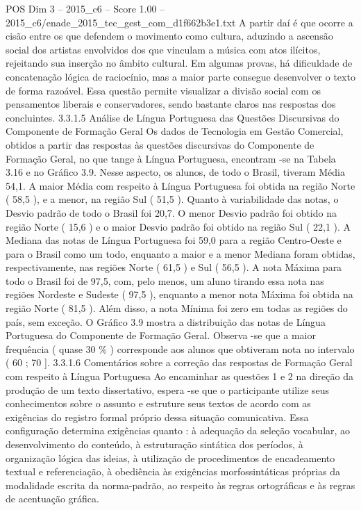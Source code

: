 \begin{textsample}{POS Dim 3 – 2015\_c6 – Score 1.00 – 2015\_c6/enade\_2015\_tec\_gest\_com\_d1f662b3e1.txt}
A partir daí é que ocorre a cisão entre os que defendem o movimento como cultura, aduzindo a ascensão social dos artistas envolvidos dos que vinculam a música com atos ilícitos, rejeitando sua inserção no âmbito cultural.
Em algumas provas, há dificuldade de concatenação lógica de raciocínio, mas a maior parte consegue desenvolver o texto de forma razoável.
Essa questão permite visualizar a divisão social com os pensamentos liberais e conservadores, sendo bastante claros nas respostas dos concluintes. 3.3.1.5 Análise de Língua Portuguesa das Questões Discursivas do Componente de Formação Geral Os dados de Tecnologia em Gestão Comercial, obtidos a partir das respostas às questões discursivas do Componente de Formação Geral, no que tange à Língua Portuguesa, encontram -se na Tabela 3.16 e no Gráfico 3.9.
Nesse aspecto, os alunos, de todo o Brasil, tiveram Média 54,1.
A maior Média com respeito à Língua Portuguesa foi obtida na região Norte ( 58,5 ), e a menor, na região Sul ( 51,5 ).
Quanto à variabilidade das notas, o Desvio padrão de todo o Brasil foi 20,7.
O menor Desvio padrão foi obtido na região Norte ( 15,6 ) e o maior Desvio padrão foi obtido na região Sul ( 22,1 ).
A Mediana das notas de Língua Portuguesa foi 59,0 para a região Centro-Oeste e para o Brasil como um todo, enquanto a maior e a menor Mediana foram obtidas, respectivamente, nas regiões Norte ( 61,5 ) e Sul ( 56,5 ).
A nota Máxima para todo o Brasil foi de 97,5, com, pelo menos, um aluno tirando essa nota nas regiões Nordeste e Sudeste ( 97,5 ), enquanto a menor nota Máxima foi obtida na região Norte ( 81,5 ).
Além disso, a nota Mínima foi zero em todas as regiões do país, sem exceção.
O Gráfico 3.9 mostra a distribuição das notas de Língua Portuguesa do Componente de Formação Geral.
Observa -se que a maior frequência ( quase 30 \% ) corresponde aos alunos que obtiveram nota no intervalo ( 60 ; 70 ]. 3.3.1.6 Comentários sobre a correção das respostas de Formação Geral com respeito à Língua Portuguesa Ao encaminhar as questões 1 e 2 na direção da produção de um texto dissertativo, espera -se que o participante utilize seus conhecimentos sobre o assunto e estruture seus textos de acordo com as exigências do registro formal próprio dessa situação comunicativa.
Essa configuração determina exigências quanto : à adequação da seleção vocabular, ao desenvolvimento do conteúdo, à estruturação sintática dos períodos, à organização lógica das ideias, à utilização de procedimentos de encadeamento textual e referenciação, à obediência às exigências morfossintáticas próprias da modalidade escrita da norma-padrão, ao respeito às regras ortográficas e às regras de acentuação gráfica.

\end{textsample}
